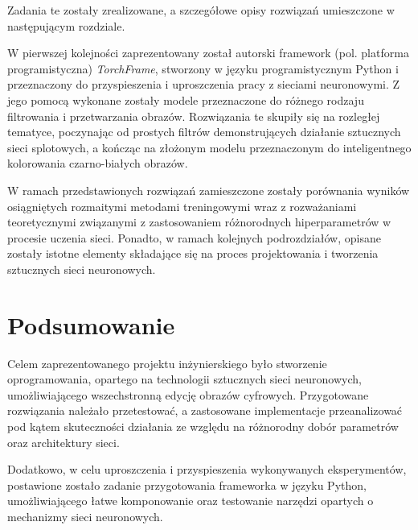 \documentclass[10pt, a4paper, twoside, notitlepage, openright]{article}
\begin{document}
  Zadania te zostały zrealizowane, a szczegółowe opisy rozwiązań umieszczone w
  następującym rozdziale.

  W pierwszej kolejności zaprezentowany został autorski framework (pol. platforma
  programistyczna) \textit{TorchFrame},
  stworzony w języku programistycznym Python i przeznaczony do przyspieszenia i uproszczenia
  pracy z sieciami neuronowymi. Z jego pomocą wykonane zostały modele przeznaczone
  do różnego rodzaju filtrowania i przetwarzania obrazów. Rozwiązania te
  skupiły się na rozległej tematyce, poczynając od prostych filtrów demonstrujących
  działanie sztucznych sieci splotowych, a kończąc na złożonym modelu przeznaczonym do
  inteligentnego kolorowania czarno-białych obrazów.

  W ramach przedstawionych rozwiązań zamieszczone zostały porównania wyników
  osiągniętych rozmaitymi metodami treningowymi wraz z rozważaniami teoretycznymi
  związanymi z zastosowaniem różnorodnych hiperparametrów w procesie uczenia sieci.
  Ponadto, w ramach kolejnych podrozdziałów, opisane zostały istotne
  elementy składające się na proces projektowania i tworzenia sztucznych sieci
  neuronowych.

  

  

  

\section{Podsumowanie}

  Celem zaprezentowanego projektu inżynierskiego było stworzenie oprogramowania,
  opartego na technologii sztucznych sieci neuronowych, umożliwiającego
  wszechstronną edycję obrazów cyfrowych. Przygotowane rozwiązania należało
  przetestować, a zastosowane implementacje przeanalizować pod kątem
  skuteczności działania ze względu na różnorodny dobór parametrów oraz
  architektury sieci.

  Dodatkowo, w celu uproszczenia i przyspieszenia wykonywanych eksperymentów,
  postawione zostało zadanie przygotowania frameworka w języku Python, umożliwiającego
  łatwe komponowanie oraz testowanie narzędzi opartych o mechanizmy sieci
  neuronowych.
\end{document}
